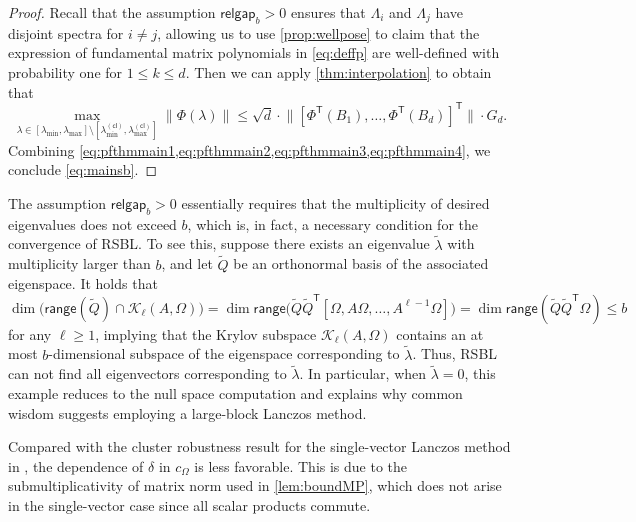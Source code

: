 \documentclass{article}
\newcommand{\Ttran}{\mathsf{T}}
\newcommand{\cl}{(\mathsf{cl})}
\newcommand{\range}{\mathsf{range}}
\newcommand{\gap}{\mathsf{relgap}}
\providecommand{\norm}[1]{\lVert#1\rVert}
\providecommand{\bignorm}[1]{\bigl\lVert#1\bigr\rVert}
\begin{document}
\begin{proof}
Recall that the assumption $\gap_{b}>0$ ensures that $\Lambda_{i}$ and $\Lambda_{j}$ have disjoint spectra for $i\neq j$, allowing us to use \cref{prop:wellpose} to claim that the expression of fundamental matrix polynomials in \cref{eq:deffp} are well-defined with probability one for $1\leq k\leq d$. Then we can apply \cref{thm:interpolation} to obtain that 
\begin{equation}
    \label{eq:pfthmmain4}
    \max_{\lambda\in [\lambda_{\min},\lambda_{\max}]\setminus [\lambda_{\min}^{\cl},\lambda_{\max}^{\cl}]} \norm{\Phi(\lambda)}
    \leq \sqrt{d}\cdot
        \bignorm{[\Phi^{\Ttran}(B_{1}) ,\dotsc,\Phi^{\Ttran}(B_{d})]^{\Ttran}} \cdot
        G_{d}.
    \end{equation}
    Combining \cref{eq:pfthmmain1,eq:pfthmmain2,eq:pfthmmain3,eq:pfthmmain4}, we conclude \cref{eq:mainsb}.
\end{proof}


The assumption $\gap_{b}>0$ essentially requires that the multiplicity of desired eigenvalues does not exceed $b$, which is, in fact, a necessary condition for the convergence of RSBL. To see this, suppose there exists an eigenvalue $\widetilde{\lambda}$ with multiplicity larger than $b$, and let $\widetilde{Q}$ be an orthonormal basis of the associated eigenspace. It holds that 
\begin{equation*}
    \dim \bigl( \range(\widetilde{Q})\cap \mathcal{K}_{\ell}(A,\Omega)\bigr) = 
    \dim \range\bigl(\widetilde{Q}\widetilde{Q}^{\Ttran}[\Omega,A\Omega,\dotsc,A^{\ell-1}\Omega]\bigr) = \dim \range(\widetilde{Q}\widetilde{Q}^{\Ttran}\Omega)\leq b
\end{equation*}
for any $\ell\geq 1$, implying that the Krylov subspace $\mathcal{K}_{\ell}(A,\Omega)$ contains an at most $b$-dimensional subspace of the eigenspace corresponding to $\widetilde{\lambda}$. Thus, RSBL can not find all eigenvectors corresponding to $\widetilde{\lambda}$. In particular, when $\widetilde{\lambda}=0$, this example reduces to the null space computation and explains why common wisdom \cite{Parlett1998} suggests employing a large-block Lanczos method.



Compared with the cluster robustness result for the single-vector Lanczos method in \cite[Eq.~(3.5)]{kressner2024randomized}, the dependence of $\delta$ in $c_{\Omega}$ is less favorable. This is due to the submultiplicativity of matrix norm used in \cref{lem:boundMP}, which does not arise in the single-vector case since all scalar products commute.
\end{document}
